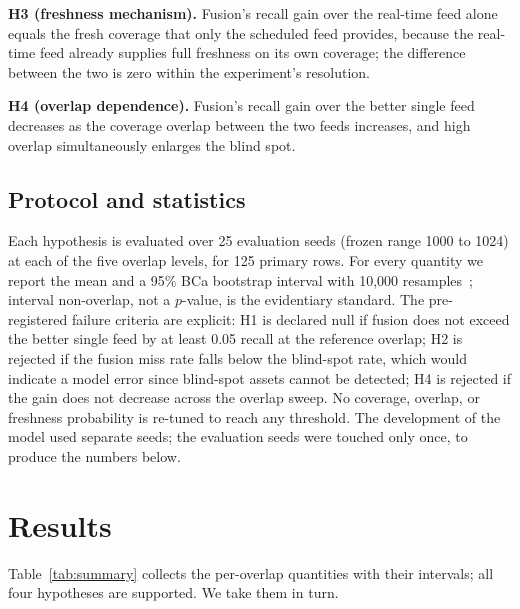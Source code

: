 \documentclass[journal]{IEEEtran}
\begin{document}
\textbf{H3 (freshness mechanism).} Fusion's recall gain over the real-time feed alone equals the
fresh coverage that only the scheduled feed provides, because the real-time feed already supplies
full freshness on its own coverage; the difference between the two is zero within the experiment's
resolution.

\textbf{H4 (overlap dependence).} Fusion's recall gain over the better single feed decreases as the
coverage overlap between the two feeds increases, and high overlap simultaneously enlarges the blind
spot.

\subsection{Protocol and statistics}
Each hypothesis is evaluated over 25 evaluation seeds (frozen range 1000 to 1024) at each of the
five overlap levels, for 125 primary rows. For every quantity we report the mean and a 95\% BCa
bootstrap interval with 10{,}000 resamples~\cite{efron1987bca,efron1994introduction}; interval
non-overlap, not a $p$-value, is the evidentiary standard. The pre-registered failure criteria are
explicit: H1 is declared null if fusion does not exceed the better single feed by at least 0.05
recall at the reference overlap; H2 is rejected if the fusion miss rate falls below the blind-spot
rate, which would indicate a model error since blind-spot assets cannot be detected; H4 is rejected
if the gain does not decrease across the overlap sweep. No coverage, overlap, or freshness
probability is re-tuned to reach any threshold. The development of the model used separate seeds;
the evaluation seeds were touched only once, to produce the numbers below.

\section{Results}
Table~\ref{tab:summary} collects the per-overlap quantities with their intervals; all four
hypotheses are supported. We take them in turn.
\end{document}
